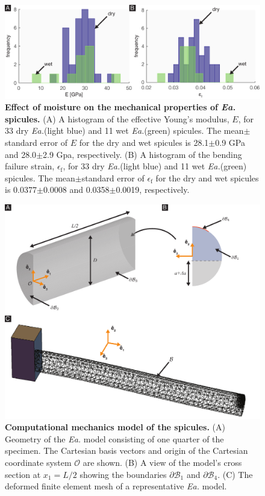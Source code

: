 \documentclass[12pt,onecolumn]{article}
\makeatletter
\newcommand{\EA}{\textit{Ea.\@}\xspace}
\makeatother
\begin{document}
\begin{bibunit}
 	\begin{figure}[H]
	\centering
	\includegraphics[width=\textwidth]{../Figures/FigureHyd/FigureA3_V1.pdf}
	\caption{\textbf{Effect of moisture on the mechanical properties of \EA spicules.} (A) A histogram of the effective Young's modulus, $E$, for 33 dry \EA (light blue) and 11 wet \EA (green) spicules. The mean$\pm$standard error of $E$ for the dry and wet spicules is 28.1$\pm$0.9 GPa and 28.0$\pm$2.9 Gpa, respectively. (B) A histogram of the bending failure strain, $\epsilon_\mathrm{f}$, for 33 dry \EA (light blue) and 11 wet \EA (green) spicules. The mean$\pm$standard error of $\epsilon_\mathrm{f}$ for the dry and wet spicules is 0.0377$\pm$0.0008 and 0.0358$\pm$0.0019, respectively.}
	\label{fig:hyd}
	\end{figure}
	
	\begin{figure}[H]
	\centering
	\includegraphics[width=\textwidth]{../Figures/FigureFEA/FigureA2_V7.pdf}
	\caption{\textbf{Computational mechanics model of the spicules.} (A) Geometry of the \EA model consisting of one quarter of the specimen. The Cartesian basis vectors and origin of the Cartesian coordinate system $\mathcal{O}$ are shown. (B) A view of the model's cross section at $x_1=L/2$ showing the boundaries $\partial \mathcal{B}_1$ and $\partial \mathcal{B}_4$. (C) The deformed finite element mesh of a representative \EA model.}
	\label{fig:FEA}
	\end{figure}
	

\end{bibunit}
\end{document}
